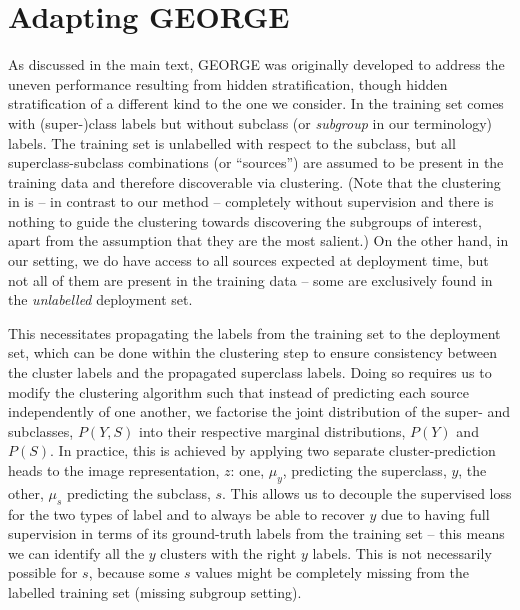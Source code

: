 \section{Adapting GEORGE}\label{adapting_g}
%
As discussed in the main text, GEORGE \citep{SohDunAngGuetal20} was originally developed to address
the uneven performance resulting from hidden stratification, though hidden stratification of a
different kind to the one we consider. 
%
In \citet{SohDunAngGuetal20} the training set comes with (super-)class labels but without subclass
(or \emph{subgroup} in our terminology) labels. 
%
The training set is unlabelled with respect to the subclass, but all superclass-subclass
combinations (or ``sources'') are assumed to be present in the training data and therefore
discoverable via clustering. 
%
(Note that the clustering in \citet{SohDunAngGuetal20} is -- in contrast to our method -- completely
without supervision and there is nothing to guide the clustering towards discovering the subgroups
of interest, apart from the assumption that they are the most salient.) 
%
On the other hand, in our setting, we do have access to all sources expected at deployment time,
but not all of them are present in the training data -- some are exclusively found in the
\emph{unlabelled} deployment set.
%

This necessitates propagating the labels from the training set to the deployment set, which can be
done within the clustering step to ensure consistency between the cluster labels and the propagated
superclass labels. 
%
Doing so requires us to modify the clustering algorithm such that instead of predicting each source
independently of one another, we factorise the joint distribution of the super- and subclasses,
$P(Y, S)$ into their respective marginal distributions, $P(Y)$ and $P(S)$.
%
In practice, this is achieved by applying two separate cluster-prediction heads to the image
representation, $z$: one, $\mu_y$, predicting the superclass, $y$, the other, $\mu_s$ predicting
the subclass, $s$. 
%
This allows us to decouple the supervised loss for the two types of label and to always be able to
recover $y$ due to having full supervision in terms of its ground-truth labels from the training
set -- this means we can identify all the $y$ clusters with the right $y$ labels.
%
This is not necessarily possible for $s$, because some $s$ values might be completely missing from
the labelled training set (missing subgroup setting).


